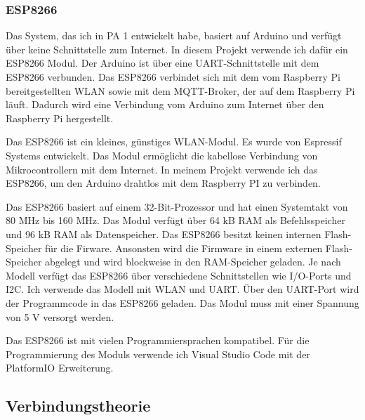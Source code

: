 \documentclass[12pt, letterpaper]{article}
\begin{document}
\subsubsection{ESP8266}
\par Das System, das ich in PA 1 entwickelt habe, basiert auf Arduino und verfügt über keine Schnittstelle zum Internet. In diesem Projekt verwende ich dafür ein ESP8266 Modul. Der Arduino ist über eine UART-Schnittstelle mit dem ESP8266 verbunden. Das ESP8266 verbindet sich mit dem vom Raspberry Pi bereitgestellten WLAN sowie mit dem MQTT-Broker, der auf dem Raspberry Pi läuft. Dadurch wird eine Verbindung vom Arduino zum Internet über den Raspberry Pi hergestellt.
\par Das ESP8266 ist ein kleines, günstiges WLAN-Modul. Es wurde von Espressif Systems entwickelt. Das Modul ermöglicht die kabellose Verbindung von Mikrocontrollern mit dem Internet. In meinem Projekt verwende ich das ESP8266, um den Arduino drahtlos mit dem Raspberry PI zu verbinden.
\par Das ESP8266 basiert auf einem 32-Bit-Prozessor und hat einen Systemtakt von 80 MHz bis 160 MHz. Das Modul verfügt über 64 kB RAM als Befehlsspeicher und 96 kB RAM als Datenspeicher. Das ESP8266 besitzt keinen internen Flash-Speicher für die Firware. Ansonsten wird die Firmware in einem externen Flash-Speicher abgelegt und wird blockweise in den RAM-Speicher geladen. Je nach Modell verfügt das ESP8266 über verschiedene Schnittstellen wie I/O-Ports und I2C. Ich verwende das Modell mit WLAN und UART. Über den UART-Port wird der Programmcode in das ESP8266 geladen. Das Modul muss mit einer Spannung von 5 V versorgt werden.
\par Das ESP8266 ist mit vielen Programmiersprachen kompatibel. Für die Programmierung des Moduls verwende ich Visual Studio Code mit der PlatformIO Erweiterung. 

\subsection{Verbindungstheorie}
\end{document}

